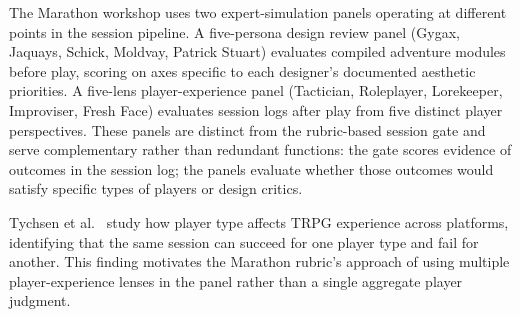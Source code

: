 The Marathon workshop uses two expert-simulation panels operating at different points
in the session pipeline. A five-persona design review panel (Gygax, Jaquays, Schick,
Moldvay, Patrick Stuart) evaluates compiled adventure modules before play, scoring on
axes specific to each designer's documented aesthetic priorities. A five-lens
player-experience panel (Tactician, Roleplayer, Lorekeeper, Improviser, Fresh Face)
evaluates session logs after play from five distinct player perspectives. These panels
are distinct from the rubric-based session gate and serve complementary rather than
redundant functions: the gate scores evidence of outcomes in the session log; the panels
evaluate whether those outcomes would satisfy specific types of players or design critics.

Tychsen et al.~\cite{tychsen2006role} study how player type affects TRPG experience
across platforms, identifying that the same session can succeed for one player type and
fail for another. This finding motivates the Marathon rubric's approach of using multiple
player-experience lenses in the panel rather than a single aggregate player judgment.
